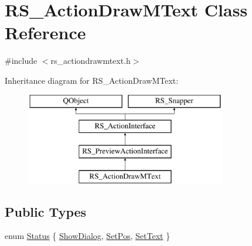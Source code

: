 \hypertarget{classRS__ActionDrawMText}{\section{R\-S\-\_\-\-Action\-Draw\-M\-Text Class Reference}
\label{classRS__ActionDrawMText}
}


{\ttfamily \#include $<$rs\-\_\-actiondrawmtext.\-h$>$}

Inheritance diagram for R\-S\-\_\-\-Action\-Draw\-M\-Text\-:\begin{figure}[H]
\begin{center}
\leavevmode
\includegraphics[height=4.000000cm]{classRS__ActionDrawMText}
\end{center}
\end{figure}
\subsection*{Public Types}
\begin{DoxyCompactItemize}
\item 
enum \hyperlink{classRS__ActionDrawMText_a4154836de860cffb7da38c19cf5ca6ef}{Status} \{ \hyperlink{classRS__ActionDrawMText_a4154836de860cffb7da38c19cf5ca6efada7b0f0df4ddced82ffb762ce05f2efc}{Show\-Dialog}, 
\hyperlink{classRS__ActionDrawMText_a4154836de860cffb7da38c19cf5ca6efa8dafdc11c4247af67eebf923cf056792}{Set\-Pos}, 
\hyperlink{classRS__ActionDrawMText_a4154836de860cffb7da38c19cf5ca6efa6869c88054524225c4befe42c1bd94de}{Set\-Text}
 \}
\end{DoxyCompactItemize}

